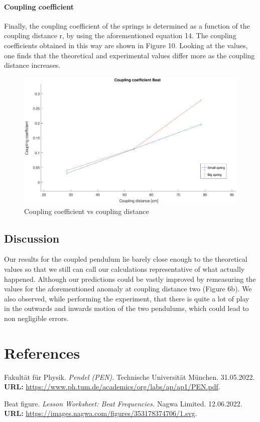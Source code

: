 \documentclass{article}
\begin{document}
\paragraph{Coupling coefficient}
Finally, the coupling coefficient of the springs is determined as a function of the coupling distance r, by using the aforementioned equation 14. The coupling coefficients obtained in this way are shown in Figure 10. Looking at the values, one finds that the theoretical and experimental values differ more as the coupling distance increases.
\begin{figure}[hbt!]
\centering
\includegraphics[width=480pt]{coupling-coffefficient-vs-distance.eps}
\caption{Coupling coefficient vs coupling distance}
\end{figure}






\subsection{Discussion}
Our results for the coupled pendulum lie barely close enough to the theoretical values so that we still can call our calculations representative of what actually happened. Although our predictions could be vastly improved by remeasuring the values for the aforementioned anomaly at coupling distance two (Figure 6b). We also observed, while performing the experiment, that there is quite a lot of play in the outwards and inwards motion of the two pendulums, which could lead to non negligible errors.
\section{References}
\begin{thebibliography}{9}
Fakultät für Physik. \emph{Pendel (PEN)}. Technische Universität München. 31.05.2022.
\textbf{URL:} \url{https://www.ph.tum.de/academics/org/labs/ap/ap1/PEN.pdf}.


Beat figure. \emph{Lesson Worksheet: Beat Frequencies.
} Nagwa Limited. 12.06.2022.
\textbf{URL:} \url{https://images.nagwa.com/figures/353178374706/1.svg}.





\end{thebibliography}
\end{document}
